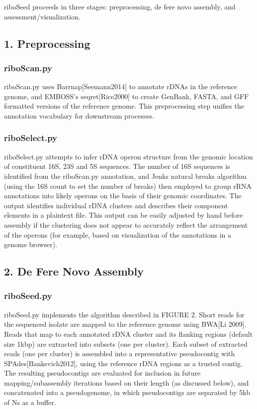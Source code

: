 \documentclass[11pt]{article}
\begin{document}
\begin{linenumbers}
riboSeed proceeds in three stages: preprocessing, de fere novo assembly, and assessment/visualization.
\subsection*{1. Preprocessing}
\subsubsection*{riboScan.py}


riboScan.py uses Barrnap[Seemann2014] to annotate rDNAs in the reference genome, and EMBOSS’s seqret[Rice2000] to create GenBank, FASTA, and GFF formatted versions of the reference genome. This preprocessing step unifies the annotation vocabulary for downstream processes.

\subsubsection*{riboSelect.py}
riboSelect.py attempts to infer rDNA operon structure from the genomic location of constituent 16S, 23S and 5S sequences. The number of 16S sequences is identified from the riboScan.py annotation, and Jenks natural breaks algorithm (using the 16S count to set the number of breaks) then employed to group rRNA annotations into likely operons on the basis of  their genomic coordinates. The output identifies individual rDNA clusters and describes their component elements in a plaintext file. This output can be easily adjusted by hand before assembly if the clustering does not appear to accurately reflect the arrangement of the operons (for example, based on visualization of the annotations in a genome browser).

\subsection*{2. De Fere Novo Assembly}
\subsubsection*{riboSeed.py}
riboSeed.py implements the algorithm described in FIGURE 2. Short reads for the sequenced isolate are mapped to the reference genome using BWA[Li 2009]. Reads that map to each annotated rDNA cluster and its flanking regions (default size 1kbp) are extracted into subsets (one per cluster). Each subset of extracted reads (one per cluster) is assembled into a representative pseudocontig with SPAdes[Bankevich2012], using the reference rDNA regions as a trusted contig. The resulting pseudocontigs are evaluated for inclusion in future mapping/subassembly iterations based on their length (as discussed below), and concatenated into a pseudogenome, in which pseudocontigs are separated by 5kb of Ns as a buffer.



\end{linenumbers}
\end{document}
